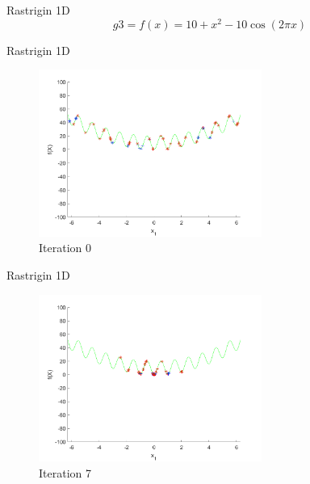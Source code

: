 \documentclass[xcolor=table]{beamer}
\begin{document}
\begin{frame}{Rastrigin 1D}
  $$
    g3=f(x) = 10 + x^2 - 10 \cos(2\pi x)
  $$
\end{frame}
\begin{frame}{Rastrigin 1D}
  \begin{figure}[h]
  \begin{center}
    \includegraphics[width=0.65\textwidth]{img/smpl/rast1d/loa-iter-0}
    \caption{Iteration 0}
  \end{center}
  \end{figure}
\end{frame}
\begin{frame}{Rastrigin 1D}
  \begin{figure}[h]
  \begin{center}
    \includegraphics[width=0.65\textwidth]{img/smpl/rast1d/loa-iter-7}
    \caption{Iteration 7}
  \end{center}
  \end{figure}
\end{frame}
\end{document}
